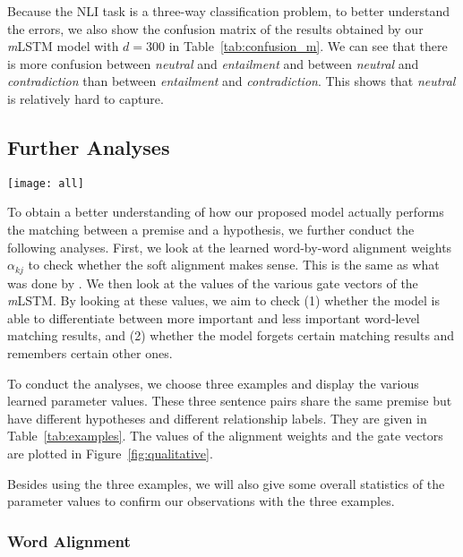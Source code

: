 \documentclass[11pt,letterpaper]{article}
\begin{document}
Because the NLI task is a three-way classification problem, to better understand the errors, we also show the confusion matrix of the results obtained by our \emph{m}LSTM model with $d = 300$ in Table~\ref{tab:confusion_m}.
We can see that there is more confusion between \emph{neutral} and \emph{entailment} and between \emph{neutral} and \emph{contradiction} than between \emph{entailment} and \emph{contradiction}.
This shows that \emph{neutral} is relatively hard to capture.






\subsection{Further Analyses}

\begin{figure*}[!ht]
\centering
\texttt{[image: all]}
\caption{The alignment weights and the gate vectors of the three examples.}
\label{fig:qualitative}
\end{figure*}


To obtain a better understanding of how our proposed model actually performs the matching between a premise and a hypothesis, we further conduct the following analyses.
First, we look at the learned word-by-word alignment weights $\alpha_{kj}$ to check whether the soft alignment makes sense.
This is the same as what was done by .
We then look at the values of the various gate vectors of the {\emph{m}LSTM}.
By looking at these values, we aim to check (1) whether the model is able to differentiate between more important and less important word-level matching results, and (2) whether the model forgets certain matching results and remembers certain other ones.

To conduct the analyses, we choose three examples and display the various learned parameter values.
These three sentence pairs share the same premise but have different hypotheses and different relationship labels.
They are given in Table~\ref{tab:examples}.
The values of the alignment weights and the gate vectors are plotted in Figure~\ref{fig:qualitative}.

Besides using the three examples, we will also give some overall statistics of the parameter values to confirm our observations with the three examples.

\subsubsection*{Word Alignment}
\end{document}
